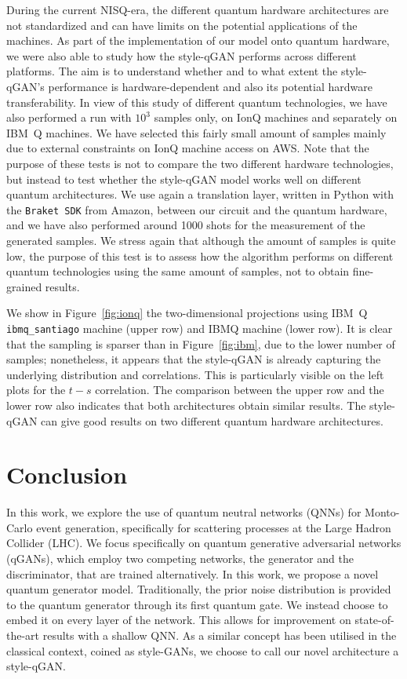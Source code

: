\documentclass[twocolumn,preprintnumbers,superscriptaddress]{revtex4-2}
\begin{document}
During the current NISQ-era, the different quantum hardware architectures are not standardized and can have limits
on the potential applications of the machines. As part of the implementation of our model onto quantum hardware, we were also able to study how the style-qGAN performs across different platforms.
The aim is to understand whether and to what extent the style-qGAN's performance is hardware-dependent and also its potential hardware transferability.
In view of this study of different quantum technologies, we have also performed a run
with $10^3$ samples only, on IonQ machines and separately on IBM~Q
machines. We have selected this fairly small amount of samples
mainly due to external constraints on IonQ machine access on AWS.
Note that the purpose of these tests is not to compare the two different hardware technologies,
but instead to test whether the style-qGAN model works well on different quantum architectures.
We use again a translation layer, written in Python with the
\texttt{Braket SDK} from Amazon, between our circuit and the quantum hardware, and we
have also performed around 1000 shots for the measurement of the generated samples.
We stress again that although the amount of samples is quite low, the purpose of this test is to assess
how the algorithm performs on different quantum technologies using the same amount of
samples, not to obtain fine-grained results.


We show in Figure~\ref{fig:ionq} the two-dimensional projections using
IBM~Q  {\tt ibmq\_santiago} machine (upper row) and IBMQ machine (lower row).
It is clear that the sampling is sparser than in Figure~\ref{fig:ibm}, due to the lower number of
samples; nonetheless, it appears that the style-qGAN is already capturing the underlying
distribution and correlations. This is particularly visible on the left plots for the $t-s$ correlation.
The comparison between the upper row and the lower row also indicates that both architectures
obtain similar results. The style-qGAN can give good results on two different quantum hardware
architectures.



\section{Conclusion}
\label{sec:conclusion}
In this work, we explore the use of quantum neutral networks (QNNs) for Monto-Carlo event generation, specifically for scattering processes at the Large Hadron Collider (LHC). We focus specifically on quantum generative adversarial networks (qGANs), which employ two competing networks, the generator and the discriminator, that are trained alternatively. In this work, we propose a novel quantum generator model. Traditionally, the prior noise distribution is provided to the quantum generator through its first quantum gate. We instead choose to embed it on every layer of the network. This allows for improvement on state-of-the-art results with a shallow QNN.  As a similar concept has been utilised in the classical context, coined as style-GANs, we choose to call our novel architecture a style-qGAN.
\end{document}
